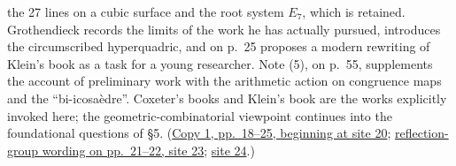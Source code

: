 the 27 lines on a cubic surface and the root system $E_7$, which is
retained. Grothendieck records the limits of the work he has actually
pursued, introduces the circumscribed hyperquadric, and on p.~25 proposes
a modern rewriting of Klein's book as a task for a young researcher.
Note (5), on p.~55, supplements the account of preliminary work with
the arithmetic action on congruence maps and the ``bi-icosaèdre''.
Coxeter's books and Klein's book are the works explicitly invoked here;
the geometric-combinatorial viewpoint continues into the foundational
questions of \S5.
(\href{https://grothendieck.umontpellier.fr/web/viewer.html?file=../119.pdf\#page=21}{Copy 1, pp.~18--25, beginning at site 20};
\href{https://grothendieck.umontpellier.fr/web/viewer.html?file=../119.pdf\#page=24}{reflection-group wording on pp.~21--22, site 23};
\href{https://grothendieck.umontpellier.fr/web/viewer.html?file=../119.pdf\#page=25}{site 24}.)

